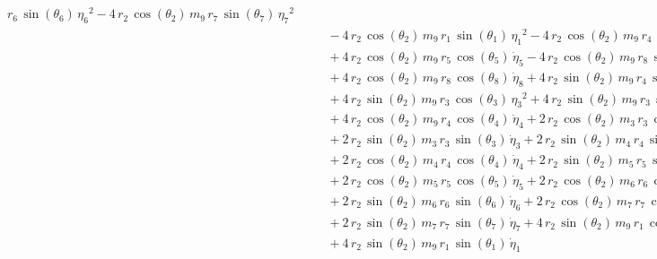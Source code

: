 \begin{eqnarray*}
{}\,r_{6}\,\sin({\theta_{6}})\,{{\eta_{6}}}^2 - 4\,r_{2}\,\cos({\theta
_{2}})\,m_{9}\,r_{7}\,\sin({\theta_{7}})\,{{\eta_{7}}}^2
 \\ &&\quad\mbox{} - 4\,r_{2}\,\cos({\theta_{2}})\,m_{9}\,r_{1}\,\sin(
{\theta_{1}})\,{{\eta_{1}}}^2 - 4\,r_{2}\,\cos({\theta_{2}})\,m_{9}\,r
_{4}\,\sin({\theta_{4}})\,{{\eta_{4}}}^2 \\ &&\quad\mbox{} + 4\,r_{2}
\,\cos({\theta_{2}})\,m_{9}\,r_{5}\,\cos({\theta_{5}})\,{\dot{\eta}_{5
}} - 4\,r_{2}\,\cos({\theta_{2}})\,m_{9}\,r_{8}\,\sin({\theta_{8}})\,{
{\eta_{8}}}^2 \\ &&\quad\mbox{} + 4\,r_{2}\,\cos({\theta_{2}})\,m_{9}
\,r_{8}\,\cos({\theta_{8}})\,{\dot{\eta}_{8}} + 4\,r_{2}\,\sin({\theta
_{2}})\,m_{9}\,r_{4}\,\sin({\theta_{4}})\,{\dot{\eta}_{4}}
 \\ &&\quad\mbox{} + 4\,r_{2}\,\sin({\theta_{2}})\,m_{9}\,r_{3}\,\cos(
{\theta_{3}})\,{{\eta_{3}}}^2 + 4\,r_{2}\,\sin({\theta_{2}})\,m_{9}\,r
_{3}\,\sin({\theta_{3}})\,{\dot{\eta}_{3}} \\ &&\quad\mbox{} + 4\,r_{2
}\,\cos({\theta_{2}})\,m_{9}\,r_{4}\,\cos({\theta_{4}})\,{\dot{\eta}_{
4}} + 2\,r_{2}\,\cos({\theta_{2}})\,m_{3}\,r_{3}\,\cos({\theta_{3}})\,
{\dot{\eta}_{3}} \\ &&\quad\mbox{} + 2\,r_{2}\,\sin({\theta_{2}})\,m_{
3}\,r_{3}\,\sin({\theta_{3}})\,{\dot{\eta}_{3}} + 2\,r_{2}\,\sin({
\theta_{2}})\,m_{4}\,r_{4}\,\sin({\theta_{4}})\,{\dot{\eta}_{4}}
 \\ &&\quad\mbox{} + 2\,r_{2}\,\cos({\theta_{2}})\,m_{4}\,r_{4}\,\cos(
{\theta_{4}})\,{\dot{\eta}_{4}} + 2\,r_{2}\,\sin({\theta_{2}})\,m_{5}
\,r_{5}\,\sin({\theta_{5}})\,{\dot{\eta}_{5}} \\ &&\quad\mbox{} + 2\,r
_{2}\,\cos({\theta_{2}})\,m_{5}\,r_{5}\,\cos({\theta_{5}})\,{
\dot{\eta}_{5}} + 2\,r_{2}\,\cos({\theta_{2}})\,m_{6}\,r_{6}\,\cos({
\theta_{6}})\,{\dot{\eta}_{6}} \\ &&\quad\mbox{} + 2\,r_{2}\,\sin({
\theta_{2}})\,m_{6}\,r_{6}\,\sin({\theta_{6}})\,{\dot{\eta}_{6}} + 2\,
r_{2}\,\cos({\theta_{2}})\,m_{7}\,r_{7}\,\cos({\theta_{7}})\,{
\dot{\eta}_{7}} \\ &&\quad\mbox{} + 2\,r_{2}\,\sin({\theta_{2}})\,m_{7
}\,r_{7}\,\sin({\theta_{7}})\,{\dot{\eta}_{7}} + 4\,r_{2}\,\sin({
\theta_{2}})\,m_{9}\,r_{1}\,\cos({\theta_{1}})\,{{\eta_{1}}}^2
 \\ &&\quad\mbox{} + 4\,r_{2}\,\sin({\theta_{2}})\,m_{9}\,r_{1}\,\sin(
{\theta_{1}})\,{\dot{\eta}_{1}} \end{eqnarray*}
